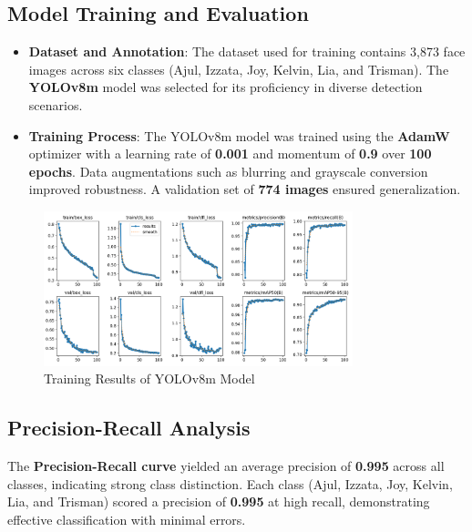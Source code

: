 \subsection{Model Training and Evaluation}
\begin{itemize}
    \item \textbf{Dataset and Annotation}: The dataset used for training contains 3,873 face images across six classes (Ajul, Izzata, Joy, Kelvin, Lia, and Trisman). The \textbf{YOLOv8m} model was selected for its proficiency in diverse detection scenarios.

    \item \textbf{Training Process}: The YOLOv8m model was trained using the \textbf{AdamW} optimizer with a learning rate of \textbf{0.001} and momentum of \textbf{0.9} over \textbf{100 epochs}. Data augmentations such as blurring and grayscale conversion improved robustness. A validation set of \textbf{774 images} ensured generalization.
\end{itemize}

\begin{figure}[htbp]
    \centering
    \includegraphics[width=0.8\textwidth]{images/results.png}
    \caption{Training Results of YOLOv8m Model}
    \label{fig:training_results}
\end{figure}

\subsection{Precision-Recall Analysis}
The \textbf{Precision-Recall curve} yielded an average precision of \textbf{0.995} across all classes, indicating strong class distinction. Each class (Ajul, Izzata, Joy, Kelvin, Lia, and Trisman) scored a precision of \textbf{0.995} at high recall, demonstrating effective classification with minimal errors.

